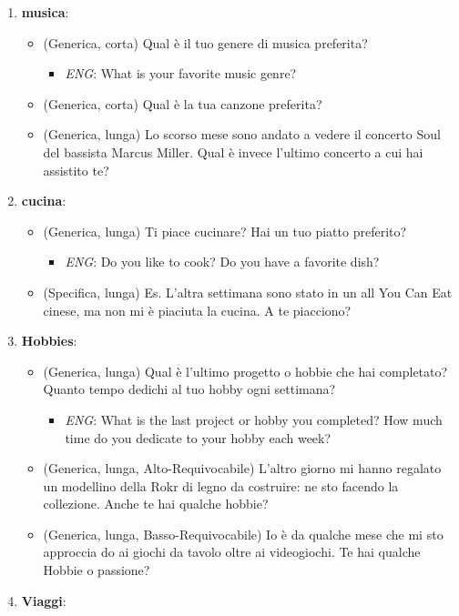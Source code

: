 \documentclass[
]{article}
\providecommand{\tightlist}{%
  \setlength{\itemsep}{0pt}\setlength{\parskip}{0pt}}
\begin{document}
\begin{enumerate}
\def\labelenumi{\arabic{enumi}.}
\tightlist
\item
  \textbf{musica}:

  \begin{itemize}
  \tightlist
  \item
    (Generica, corta) Qual è il tuo genere di musica preferita?

    \begin{itemize}
    \tightlist
    \item
      \emph{ENG}: What is your favorite music genre?
    \end{itemize}
  \item
    (Generica, corta) Qual è la tua canzone preferita?
  \item
    (Generica, lunga) Lo scorso mese sono andato a vedere il concerto Soul del bassista Marcus Miller. Qual è invece l'ultimo concerto a cui hai assistito te?
  \end{itemize}
\item
  \textbf{cucina}:

  \begin{itemize}
  \tightlist
  \item
    (Generica, lunga) Ti piace cucinare? Hai un tuo piatto preferito?

    \begin{itemize}
    \tightlist
    \item
      \emph{ENG}: Do you like to cook? Do you have a favorite dish?
    \end{itemize}
  \item
    (Specifica, lunga) Es. L'altra settimana sono stato in un all You Can Eat cinese, ma non mi è piaciuta la cucina. A te piacciono?
  \end{itemize}
\item
  \textbf{Hobbies}:

  \begin{itemize}
  \tightlist
  \item
    (Generica, lunga) Qual è l'ultimo progetto o hobbie che hai completato? Quanto tempo dedichi al tuo hobby ogni settimana?

    \begin{itemize}
    \tightlist
    \item
      \emph{ENG}: What is the last project or hobby you completed? How much time do you dedicate to your hobby each week?
    \end{itemize}
  \item
    (Generica, lunga, Alto-Requivocabile) L'altro giorno mi hanno regalato un modellino della Rokr di legno da costruire: ne sto facendo la collezione. Anche te hai qualche hobbie?
  \item
    (Generica, lunga, Basso-Requivocabile) Io è da qualche mese che mi sto approccia do ai giochi da tavolo oltre ai videogiochi. Te hai qualche Hobbie o passione?
  \end{itemize}
\item
  \textbf{Viaggi}:


\end{enumerate}
\end{document}
